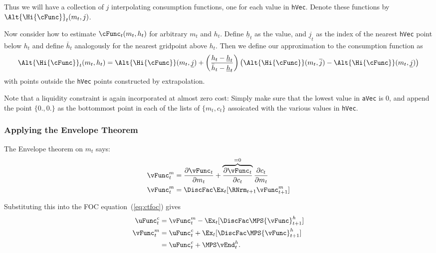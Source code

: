 \documentclass[titlepage, headings=optiontotocandhead]{\econtex}
\begin{document}
{  Thus we will have a collection of $j$ interpolating consumption
  functions, one for each value in \texttt{hVec}.  Denote these
  functions by $\Alt{\Hi{\cFunc}}_{t}({m}_{t},j)$.

  Now consider how to estimate $\cFunc_{t}({m}_{t},h_{t})$ for arbitrary
  ${m}_{t}$ and $h_{t}$.  Define $\underline{h}_{t}$ as the value, and
  $\underline{j}_{t}$ as the index of the nearest \texttt{hVec} point
  below $h_{t}$ and define $\bar{h}_{t}$ analogously for the nearest
  gridpoint above $h_{t}$.  Then we define our approximation to the
  consumption function as
  \begin{displaymath}
    \Alt{\Hi{\cFunc}}_{t}({m}_{t},h_{t}) =
    \Alt{\Hi{\cFunc}}({m}_{t},\underline{j})+\left(\frac{h_{t}-\underline{h}_{t}}
      {\bar{h}_{t}-\underline{h}_{t}}\right)
    \left(\Alt{\Hi{\cFunc}}({m}_{t},\overline{j})
      -\Alt{\Hi{\cFunc}}({m}_{t},\underline{j})\right)
  \end{displaymath}
  with points outside the \texttt{hVec} points constructed by
  extrapolation.

  Note that a liquidity constraint is again incorporated at almost
  zero cost: Simply make sure that the lowest value in
  \texttt{aVec} is 0, and append the point $\{0.,0.\}$ as the
  bottommost point in each of the lists of $\{{m}_{t},{c}_{t}\}$
  assoicated with the various values in \texttt{hVec}.

  \hypertarget{Applying-the-Envelope-Theorem}{}
  \subsubsection{Applying the Envelope Theorem}
  The Envelope theorem on ${m}_{t}$ says:
  \begin{equation}\begin{gathered}\begin{aligned}
        {\vFunc}^{m}_{t}  & = \frac{\partial {\vFunc}_{t}}{\partial {m}_{t}} + \overbrace{\frac{\partial {\vFunc}_{t}}{\partial {c}_{t}}}^{=0}\frac{\partial {c}_{t}}{\partial {m}_{t}} \label{eq:vxt} \\
        {\vFunc}_{t}^{m}  & = \DiscFac  \Ex_{t} [\RNrm_{t+1} {\vFunc}_{t+1}^{m}] \label{eq:envelopex}
      \end{aligned}\end{gathered}\end{equation}

  Substituting this into the FOC equation~(\ref{eq:ctfoc}) gives
  \begin{equation}\begin{gathered}\begin{aligned}
        \uFunc^{c}_{t}  & = {\vFunc}_{t}^{m}-\Ex_{t}[\DiscFac \MPS {\vFunc}_{t+1}^{h}] \label{eq:ctfocsubx}
        \\ {\vFunc}_{t}^{m}  & = \uFunc^{c}_{t}+\Ex_{t}[\DiscFac \MPS {\vFunc}_{t+1}^{h}] \label{eq:vtfoc}
        \\            & = \uFunc^{c}_{t}+\MPS \vEnd_{t}^{h} \label{eq:vxtformula}.
      \end{aligned}\end{gathered}\end{equation}

}
\end{document}
